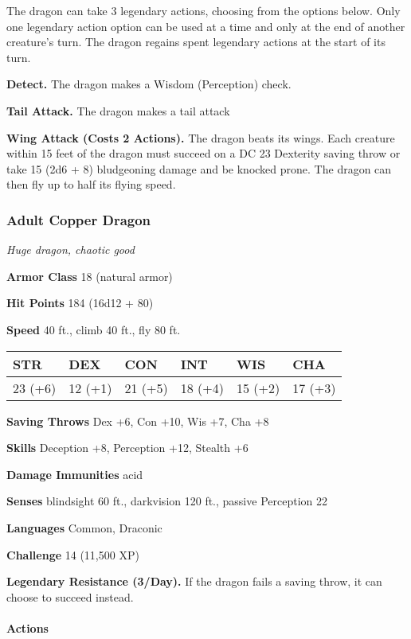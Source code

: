 \documentclass[
]{article}
\begin{document}
The dragon can take 3 legendary actions, choosing from the options
below. Only one legendary action option can be used at a time and only
at the end of another creature's turn. The dragon regains spent
legendary actions at the start of its turn.

\textbf{Detect.} The dragon makes a Wisdom (Perception) check.

\textbf{Tail Attack.} The dragon makes a tail attack

\textbf{Wing Attack (Costs 2 Actions).} The dragon beats its wings. Each
creature within 15 feet of the dragon must succeed on a DC 23 Dexterity
saving throw or take 15 (2d6 + 8) bludgeoning damage and be knocked
prone. The dragon can then fly up to half its flying speed.

\hypertarget{adult-copper-dragon}{%
\subsubsection{Adult Copper Dragon}\label{adult-copper-dragon}}

\emph{Huge dragon, chaotic good}

\textbf{Armor Class} 18 (natural armor)

\textbf{Hit Points} 184 (16d12 + 80)

\textbf{Speed} 40 ft., climb 40 ft., fly 80 ft.

\begin{longtable}[]{@{}llllll@{}}
\toprule
STR & DEX & CON & INT & WIS & CHA\tabularnewline
\midrule
\endhead
23 (+6) & 12 (+1) & 21 (+5) & 18 (+4) & 15 (+2) & 17 (+3)\tabularnewline
\bottomrule
\end{longtable}

\textbf{Saving Throws} Dex +6, Con +10, Wis +7, Cha +8

\textbf{Skills} Deception +8, Perception +12, Stealth +6

\textbf{Damage Immunities} acid

\textbf{Senses} blindsight 60 ft., darkvision 120 ft., passive
Perception 22

\textbf{Languages} Common, Draconic

\textbf{Challenge} 14 (11,500 XP)

\textbf{Legendary Resistance (3/Day).} If the dragon fails a saving
throw, it can choose to succeed instead.

\hypertarget{actions-52}{%
\paragraph{Actions}\label{actions-52}}
\end{document}
